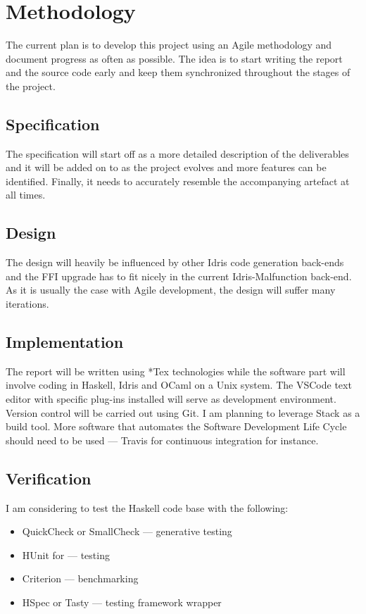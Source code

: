 \documentclass[a4paper]{report}
\begin{document}
\section{Methodology}
The current plan is to develop this project using an Agile
methodology and document progress as often as possible.
The idea is to start writing the report and the source code early and keep
them synchronized throughout the stages of the project.

\subsection{Specification}
The specification will start off as a more detailed description of the
deliverables and it will be added on to as the project evolves and more
features can be identified.
Finally, it needs to accurately resemble the accompanying artefact at all times.
\subsection{Design}
The design will heavily be influenced by other Idris code generation back-ends
and the FFI upgrade has to fit nicely in the current Idris-Malfunction back-end.
As it is usually the case with Agile development, the design will suffer many
iterations.
\subsection{Implementation}
The report will be written using *Tex technologies while the software part will
involve coding in Haskell, Idris and OCaml on a Unix system.
The VSCode text editor with specific plug-ins installed will serve as
development environment.
Version control will be carried out using Git.
I am planning to leverage Stack as a build tool.
More software that automates the Software Development Life Cycle
should need to be used --- Travis for continuous integration for instance.

\subsection{Verification}
I am considering to test the Haskell code base with the following:
\begin{itemize}
	\item QuickCheck or SmallCheck --- generative testing
	\item HUnit for --- testing
	\item Criterion --- benchmarking
	\item HSpec or Tasty --- testing framework wrapper
\end{itemize}
\end{document}
